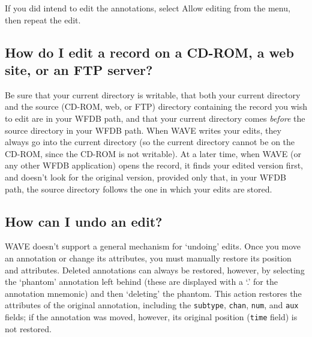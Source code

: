 \documentclass[twoside]{book}
\newcommand{\button}[1]{\cornersize{2}\ovalbox{\rule[-.3mm]{0cm}{2.5mm}\small\sf ~#1~}}
\newcommand{\menubutton}[1]{\button{#1~\ensuremath{\nabla}}}
\newcommand{\WAVE}{{\sf WAVE}\xspace}
\begin{document}
If you did intend to edit the annotations, select {\sf Allow editing} from the
\menubutton{Edit} menu, then repeat the edit.

\subsection{How do I edit a record on a CD-ROM, a web site, or an FTP server?}

Be sure that your current directory is writable, that both your current
directory and the source (CD-ROM, web, or FTP) directory containing the record
you wish to edit are in your WFDB path, and that your current directory comes
\emph{before} the source directory in your WFDB path.  When \WAVE{} writes your
edits, they always go into the current directory (so the current directory
cannot be on the CD-ROM, since the CD-ROM is not writable).  At a later time,
when \WAVE{} (or any other WFDB application) opens the record, it finds your
edited version first, and doesn't look for the original version, provided only
that, in your WFDB path, the source directory follows the one in which your
edits are stored.

\subsection{How can I undo an edit?}

\WAVE{} doesn't support a general mechanism for `undoing' edits.  Once
you move an annotation or change its attributes, you must manually
restore its position and attributes.  Deleted annotations can always
be restored, however, by selecting the `phantom' annotation left
behind (these are displayed with a `{\sf .}' for the annotation
mnemonic) and then `deleting' the phantom.  This action restores the
attributes of the original annotation, including the {\tt subtype},
{\tt chan}, {\tt num}, and {\tt aux} fields; if the annotation was
moved, however, its original position ({\tt time} field) is not restored.
\end{document}
